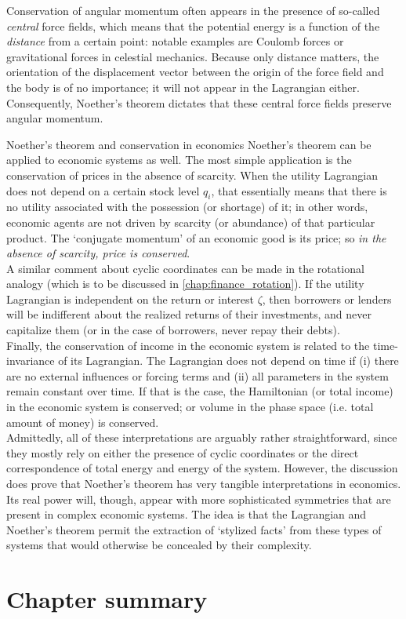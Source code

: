 Conservation of angular momentum often appears in the presence of so-called \emph{central} force fields, which means that the potential energy is a function of the \emph{distance} from a certain point: notable examples are Coulomb forces or gravitational forces in celestial mechanics. Because only distance matters, the orientation of the displacement vector between the origin of the force field and the body is of no importance; it will not appear in the Lagrangian either. Consequently, Noether's theorem dictates that these central force fields preserve angular momentum.

\begin{econ}{Noether's theorem and conservation in economics}
    Noether's theorem can be applied to economic systems as well. The most simple application is the conservation of prices in the absence of scarcity. When the utility Lagrangian does not depend on a certain stock level $q_i$, that essentially means that there is no utility associated with the possession (or shortage) of it; in other words, economic agents are not driven by scarcity (or abundance) of that particular product. The `conjugate momentum' of an economic good is its price; so \emph{in the absence of scarcity, price is conserved}.\\
    
    A similar comment about cyclic coordinates can be made in the rotational analogy (which is to be discussed in \cref{chap:finance_rotation}). If the utility Lagrangian is independent on the return or interest $\zeta$, then borrowers or lenders will be indifferent about the realized returns of their investments, and never capitalize them (or in the case of borrowers, never repay their debts).\\
    
    Finally, the conservation of income in the economic system is related to the time-invariance of its Lagrangian. The Lagrangian does not depend on time if (i) there are no external influences or forcing terms and (ii) all parameters in the system remain constant over time. If that is the case, the Hamiltonian (or total income) in the economic system is conserved; or volume in the phase space (i.e. total amount of money) is conserved.\\
    
    Admittedly, all of these interpretations are arguably rather straightforward, since they mostly rely on either the presence of cyclic coordinates or the direct correspondence of total energy and energy of the system. However, the discussion does prove that Noether's theorem has very tangible interpretations in economics. Its real power will, though, appear with more sophisticated symmetries that are present in complex economic systems. The idea is that the Lagrangian and Noether's theorem permit the extraction of `stylized facts' from these types of systems that would otherwise be concealed by their complexity. 
\end{econ}

\section*{Chapter summary}